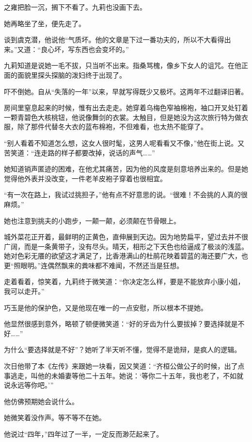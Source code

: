 \par 之雍把脸一沉，搁下不看了。九莉也没画下去。
\par 她再略坐了坐，便先走了。
\par 谈到虞克潜，他说他“气质坏。他的文章是下过一番功夫的，所以不大看得出来。”又道：“良心坏，写东西也会变坏的。”
\par 九莉知道是说她一毛不拔，只当听不出来。指桑骂槐，像乡下女人的诅咒。在他正面的面貌里探头探脑的泼妇终于出现了。
\par 吓不倒她。自从“失落的一年”以来，早就写得既少又极坏。这两年不过翻译旧著。
\par 房间里窒息起来的时候，惟有出去走走。她穿着乌梅色窄袖棉袍，袖口开叉处钉着一颗青碧色大核桃钮，他说像舞剑的衣裳。太触目，但是她没为这次旅行特为做衣服，除了那件代替冬大衣的蓝布棉袍，不但难看，也太热不能穿了。
\par “别人看着不知道怎么想，这女人很时髦，这男人呢看看又不像，”他在街上说。又苦笑道：“连走路的样子都要改掉，说话的声气……”
\par 她知道销声匿迹的困难，在他尤其痛苦，因为他的风度是刻意培养出来的。但是她觉得他外表并没改变，一件老羊皮袍子穿着也很相宜。
\par “有一次在路上，我试过挑担子，”他有点不好意思的说。“很难！不会挑的人真的很麻烦。”
\par 她也注意到挑夫的小跑步，一颠一颠，必须颠在节骨眼上。
\par 城外菜花正开着，最鲜明的正黄色，直伸展到天边。因为地势扁平，望过去并不很广阔，而是一条黄带子，没有尽头。晴天，相形之下天色也给逼成了极淡的浅蓝。她对色彩无餍的欲望这才满足了，比香港满山的杜鹃花映着碧蓝的海还要广大，也更“照眼明。”连偶然飘来的粪味都不难闻，不然还当是狂想。
\par 走着看着，惊笑着，九莉终于微笑道：“你决定怎么样，要是不能放弃小康小姐，我可以走开。”
\par 巧玉是他的保护色，又是他现在唯一的一点安慰，所以根本不提她。
\par 他显然很感到意外，略顿了顿便微笑道：“好的牙齿为什么要拔掉？要选择就是不好……”
\par 为什么“要选择就是不好”？她听了半天听不懂，觉得不是诡辩，是疯人的逻辑。
\par 次日他带了本《左传》来跟她一块看，因又笑道：“齐桓公做公子的时候，出了点事逃走，叫他的未婚妻等他二十五年。她说：‘等你二十五年，我也老了，不如就说永远等你吧。'”
\par 他仿佛预期她会说什么。
\par 她微笑着没作声。等不等不在她。
\par 他说过“四年，”四年过了一半，一定反而渺茫起来了。
